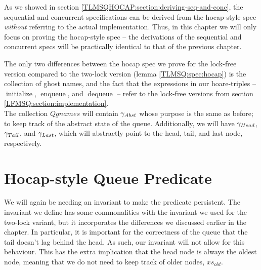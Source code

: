 \documentclass[a4paper, 11pt]{report}
\newcommand{\initialise}{\operatorname{initialize}}
\newcommand{\enqueue}{\operatorname{enqueue}}
\newcommand{\dequeue}{\operatorname{dequeue}}
\newcommand{\Qgnames}{Qgnames}
\begin{document}
As we showed in section \ref{TLMSQHOCAP:section:deriving-seq-and-conc}, the sequential and concurrent specifications can be derived from the hocap-style spec \emph{without} referring to the actual implementation. Thus, in this chapter we will only focus on proving the hocap-style spec -- the derivations of the sequential and concurrent specs will be practically identical to that of the previous chapter.

The only two differences between the hocap spec we prove for the lock-free version compared to the two-lock version (lemma \ref{TLMSQ:spec:hocap}) is the collection of ghost names, and the fact that the expressions in our hoare-triples -- $\initialise$, $\enqueue$, and $\dequeue$ -- refer to the lock-free versions from section \ref{LFMSQ:section:implementation}.\\
The collection $\Qgnames$ will contain $\gamma_{Abst}$ whose purpose is the same as before; to keep track of the abstract state of the queue. Additionally, we will have $\gamma_{Head}$, $\gamma_{Tail}$, and $\gamma_{Last}$, which will abstractly point to the head, tail, and last node, respectively. 

\section{Hocap-style Queue Predicate}
\label{LFMSQ:section:hocap-queue-pred}

We will again be needing an invariant to make the predicate persistent. The invariant we define has some commonalities with the invariant we used for the two-lock variant, but it incorporates the differences we discussed earlier in the chapter. In particular, it is important for the correctness of the queue that the tail doesn't lag behind the head. As such, our invariant will not allow for this behaviour. This has the extra implication that the head node is always the oldest node, meaning that we do not need to keep track of older nodes, $xs_{old}$.
\end{document}
